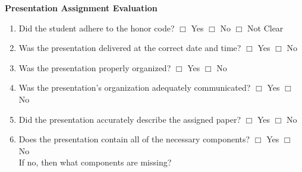 \documentclass[letterpaper, 10pt]{article} %
\begin{document}
\normalsize{

\begin{center}{\bf Presentation Assignment Evaluation} \end{center}

\begin{enumerate}

\setlength{\itemsep}{1pt}

\item Did the student adhere to the honor code? \hspace*{.05in}  $\Box$ Yes
  \hspace*{.05in} $\Box$ No \hspace*{.05in}  $\Box$ Not Clear

\item Was the presentation delivered at the correct date and
  time? \hspace*{.05in} $\Box$ Yes
  \hspace*{.05in} $\Box$ No

\item Was the presentation properly organized? \hspace*{.05in} $\Box$ Yes
  \hspace*{.05in} $\Box$ No 

\item Was the presentation's organization adequately
  communicated? \hspace*{.05in} $\Box$ Yes
  \hspace*{.05in} $\Box$ No

\item Did the presentation accurately describe the
  assigned paper? \hspace*{.05in} $\Box$ Yes
  \hspace*{.05in} $\Box$ No


\item Does the presentation contain all of the necessary
  components? \hspace*{.05in} $\Box$ Yes
  \hspace*{.05in} $\Box$ No \\ \hspace*{.05in} If no, then what
  components are missing? \vspace*{-.05in}


\end{enumerate}}
\end{document}
